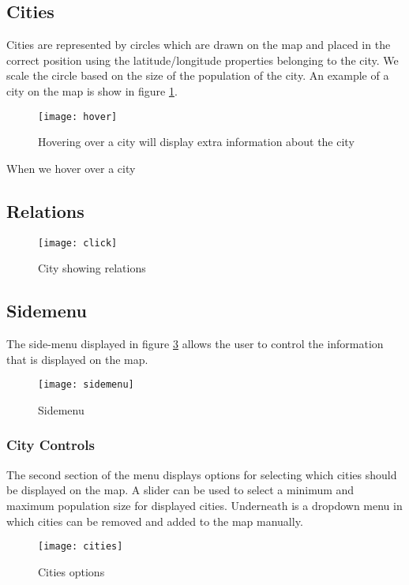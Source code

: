 \subsection{Cities}
Cities are represented by circles which are drawn on the map and placed in the correct position using the latitude/longitude properties belonging to the city. We scale the circle based on the size of the population of the city. An example of a city on the map is show in figure \ref{fig:map-city}.

\begin{figure}[H]
  \centering
  \texttt{[image: hover]}
  \caption{Hovering over a city will display extra information about the city}
  \label{fig:map-city}
\end{figure}

When we hover over a city 

\subsection{Relations}


\begin{figure}[H]
  \centering
  \texttt{[image: click]}
  \caption{City showing relations}
  \label{fig:sub2}
\end{figure}

\subsection{Sidemenu}

The side-menu displayed in figure \ref{fig:sidemenu} allows the user to control the information that is displayed on the map.  

\begin{figure}[H]
    \centering
    \texttt{[image: sidemenu]}
    \caption{Sidemenu}
    \label{fig:sidemenu}
\end{figure}


\subsubsection{City Controls}
The second section of the menu displays options for selecting which cities should be displayed on the map. A slider can be used to select a minimum and maximum population size for displayed cities. Underneath is a dropdown menu in which cities can be removed and added to the map manually. 

\begin{figure}[H]
    \centering
    \texttt{[image: cities]}
    \caption{Cities options}
    \label{fig:infoflow}
\end{figure}

